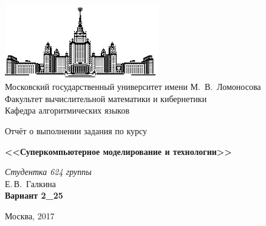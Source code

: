 \documentclass[11pt]{article}
\begin{document}
\thispagestyle{empty}

\begin{center}
\ \vspace{-3cm}

\includegraphics[width=0.5\textwidth]{msu.eps}\\
{Московский государственный университет имени М.~В.~Ломоносова}\\
Факультет вычислительной математики и кибернетики\\
Кафедра алгоритмических языков

\vfill

{\LARGE Отчёт о выполнении задания по курсу}

\vspace{1cm}

    {\Huge\bfseries <<Суперкомпьютерное моделирование и технологии>>}
\end{center}

\vspace{1cm}

\begin{flushright}
  \large
  \textit{Студентка 624 группы}\\
  Е.\,В.~Галкина\\
  \textbf{Вариант 2\_25}\\
\end{flushright}

\vfill

\begin{center}
Москва, 2017
\end{center}
\end{document}

